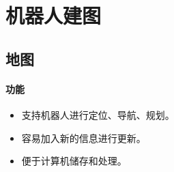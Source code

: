 \documentclass[
12pt, %
a4paper, 
oneside, %
headinclude,footinclude, %
]{scrartcl}
\begin{document}
\section{机器人建图}
\subsection[地图]{地图}
\paragraph{功能}
\begin{itemize}
\item 支持机器人进行定位、导航、规划。
\item 容易加入新的信息进行更新。
\item 便于计算机储存和处理。
\end{itemize}
\end{document}

